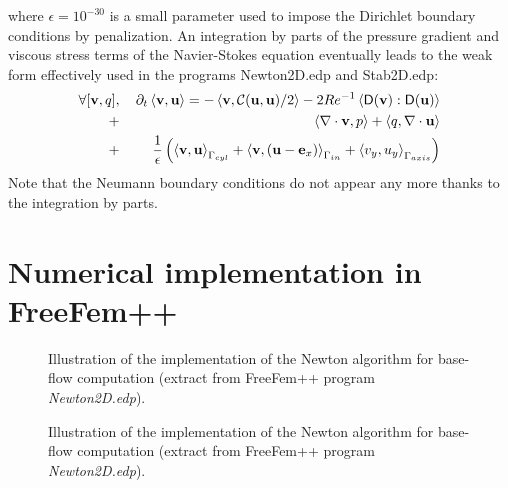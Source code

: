 \documentclass[twocolumn,10pt]{asme2ej}
\begin{document}
where $\epsilon=10^{-30}$ is a small parameter used to impose the Dirichlet boundary conditions by penalization.
An integration by parts of the pressure gradient and viscous stress terms of the Navier-Stokes equation eventually 
leads to the weak form effectively used in the programs {\sf Newton2D.edp} and {\sf Stab2D.edp}:
\begin{eqnarray}
\forall [{\bf v},q], &&\, \partial_t \left< {\bf v}, {\bf u}\right> = - \left< {\bf v} , {\cal C}({\bf u},{\bf u})/2 \right>
- 2 Re^{-1} \left< {\mathsf D}({\bf v}) : {\mathsf D}({\bf u})  \right>  \nonumber \\
+ &&\left< \nabla \cdot {\bf v}, p \right> + \left< q, \nabla \cdot {\bf u} \right> \label{NSweakFullN} \\
+ &&\frac{1}{\epsilon} \left(  \left< {\bf v}, \bf{u} \right>_{\Gamma_{cyl}} + \left< {\bf v}, ({\bf u}- {\bf e}_x ) \right>_{\Gamma_{in}} 
+ \left< v_y, u_y\right>_{\Gamma_{axis}} \right) \nonumber 
\end{eqnarray}
Note that the Neumann boundary conditions do not appear any more thanks to the integration by parts.

\section{Numerical implementation in FreeFem++}



\begin{figure*}[t]
\small

 \normalsize
\caption{Illustration of the implementation of the Newton algorithm for base-flow computation (extract from FreeFem++ program {\em Newton2D.edp}).}
\label{Listing2}
\end{figure*}

\begin{figure*}[t]
\small

 \normalsize
\caption{Illustration of the implementation of the Newton algorithm for base-flow computation (extract from FreeFem++ program {\em Newton2D.edp}).}
\label{Listing2}
\end{figure*}
\end{document}
